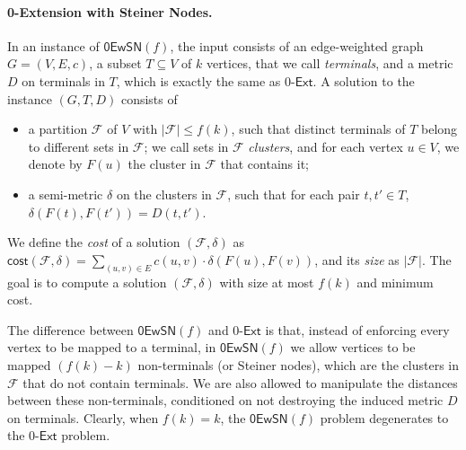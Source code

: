 \documentclass[11pt]{article}
\theoremstyle{definition}
\newcommand{\fset}{{\mathcal{F}}}
\newcommand{\dist}{\textnormal{\textsf{dist}}}
\newcommand\vol{\mathsf{cost}}
\newcounter{note}
\newcommand{\zesn}{\mathsf{0EwSN}}
\newcommand{\ze}{$0$-$\textsf{Ext}$\xspace}
\begin{document}
\begin{titlepage}
\paragraph{0-Extension with Steiner Nodes.}
In an instance of $\zesn(f)$, the input consists of an edge-weighted graph $G=(V,E,c)$, a subset $T\subseteq V$ of $k$ vertices, that we call \emph{terminals}, and a metric $D$ on terminals in $T$, which is exactly the same as \ze.
A solution to the instance $(G,T,D)$ consists of 
\begin{itemize}
\item a partition $\fset$ of $V$ with $|\fset|\le f(k)$, such that distinct terminals of $T$ belong to different sets in $\fset$; we call sets in $\fset$ \emph{clusters}, and for each vertex $u\in V$, we denote by $F(u)$ the cluster in $\fset$ that contains it;
\item a semi-metric $\delta$ on the clusters in $\fset$, such that for each pair $t,t'\in T$, $\delta(F(t),F(t'))= D(t,t')$.
\end{itemize}
%
We define the \emph{cost} of a solution $(\fset,\delta)$ as $\vol(\fset,\delta)=\sum_{(u,v)\in E}c(u,v)\cdot\delta(F(u),F(v))$, and its \emph{size} as $|\fset|$.
The goal is to compute a solution $(\fset,\delta)$ with size at most $f(k)$ and minimum cost. 

The difference between $\zesn(f)$ and \ze is that, instead of enforcing every vertex to be mapped to a terminal, in $\zesn(f)$ we allow vertices to be mapped $(f(k)-k)$ non-terminals (or Steiner nodes), which are the clusters in $\fset$ that do not contain terminals. 
We are also allowed to manipulate the distances between these non-terminals, conditioned on not destroying the induced metric $D$ on terminals. Clearly, when $f(k)=k$, the $\zesn(f)$ problem degenerates to the \ze problem.



\end{titlepage}
\end{document}
